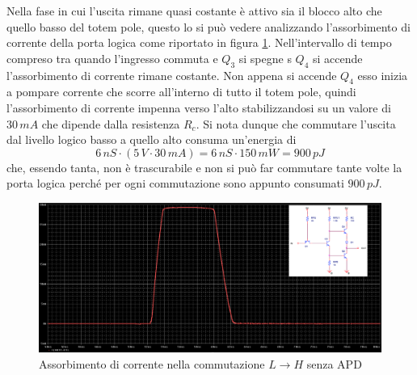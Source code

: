 \documentclass[12pt, a4paper]{report}
\begin{document}
Nella fase in cui l'uscita rimane quasi costante è attivo sia il blocco alto che quello basso del totem pole, questo lo si può vedere analizzando l'assorbimento di corrente della porta logica come riportato in figura \ref{l_to_h1}. Nell'intervallo di tempo compreso tra quando l'ingresso commuta e $Q_3$ si spegne s $Q_4$ si accende l'assorbimento di corrente rimane costante. Non appena si accende $Q_4$ esso inizia a pompare corrente che scorre all'interno di tutto il totem pole, quindi l'assorbimento di corrente impenna verso l'alto stabilizzandosi su un valore di $30\,mA$ che dipende dalla resistenza $R_c$. Si nota dunque che commutare l'uscita dal livello logico basso a quello alto consuma un'energia di
\begin{equation*}
    6\,nS \cdot (5\,V \cdot 30\,mA) = 6\,nS \cdot 150\,mW = 900\,pJ
\end{equation*}
che, essendo tanta, non è trascurabile e non si può far commutare tante volte la porta logica perché per ogni commutazione sono appunto consumati $900\,pJ$. 
\begin{figure}[ht]
    \centering
    \includegraphics[scale=0.35,angle=0]{ttl_l_to_h_noapd2.png}
    \caption{Assorbimento di corrente nella commutazione $L \rightarrow H$ senza APD}
    \label{l_to_h1}
\end{figure}
\end{document}

